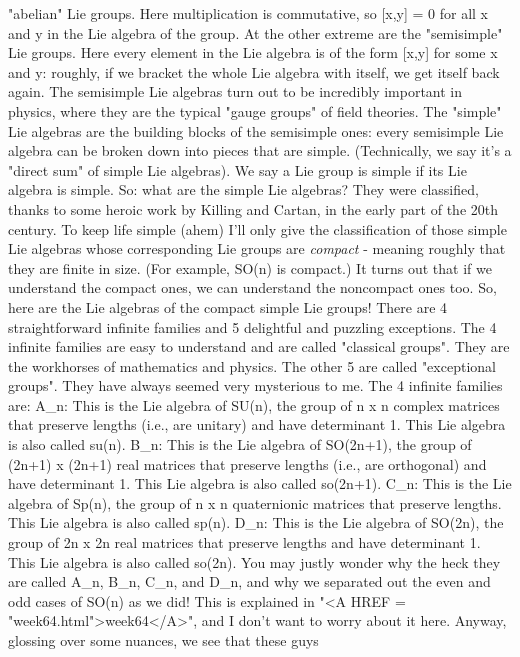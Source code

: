 "abelian" Lie groups.  Here multiplication is commutative, so [x,y] =
0 for all x and y in the Lie algebra of the group.  At the other
extreme are the "semisimple" Lie groups.  Here every element in the
Lie algebra is of the form [x,y] for some x and y: roughly, if we
bracket the whole Lie algebra with itself, we get itself back again.
The semisimple Lie algebras turn out to be incredibly important in
physics, where they are the typical "gauge groups" of field theories.
The "simple" Lie algebras are the building blocks of the semisimple ones:
every semisimple Lie algebra can be broken down into pieces that are
simple.  (Technically, we say it's a "direct sum" of simple Lie algebras).
We say a Lie group is simple if its Lie algebra is simple.    
So: what are the simple Lie algebras?  They were classified, thanks to
some heroic work by Killing and Cartan, in the early part of the 20th
century.  To keep life simple (ahem) I'll only give the classification
of those simple Lie algebras whose corresponding Lie groups are
\emph{compact} - meaning roughly that they are finite in size.  (For
example, SO(n) is compact.)  It turns out that if we understand the
compact ones, we can understand the noncompact ones too.
So, here are the Lie algebras of the compact simple Lie groups!  There are
4 straightforward infinite families and 5 delightful and puzzling
exceptions.  The 4 infinite families are easy to understand and are
called "classical groups".  They are the workhorses of mathematics and
physics.  The other 5 are called "exceptional groups".  They have
always seemed very mysterious to me.  
The 4 infinite families are:
A_n: This is the Lie algebra of SU(n), the group of n x n complex
matrices that preserve lengths (i.e., are unitary) and have
determinant 1.   This Lie algebra is also called su(n).  
B_n: This is the Lie algebra of SO(2n+1), the group of (2n+1) x (2n+1)
real matrices that preserve lengths (i.e., are orthogonal) and have
determinant 1.  This Lie algebra is also called so(2n+1).
C_n: This is the Lie algebra of Sp(n), the group of n x n quaternionic
matrices that preserve lengths.  This Lie algebra is also called sp(n).
D_n: This is the Lie algebra of SO(2n), the group of 2n x 2n real matrices
that preserve lengths and have determinant 1.  This Lie algebra is also
called so(2n).
You may justly wonder why the heck they are called A_n, B_n, C_n, and
D_n, and why we separated out the even and odd cases of SO(n) as we
did!  This is explained in "<A HREF = "week64.html">week64</A>", and I don't 
want to worry about
it here.  Anyway, glossing over some nuances, we see that these guys
